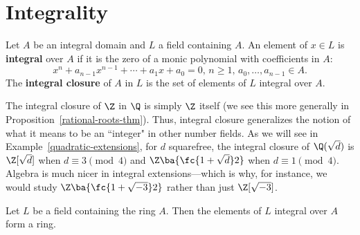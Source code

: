 \section{Integrality}
\begin{df}
Let $A$ be an integral domain and $L$ a field containing $A$. An element of $x\in L$ is \textbf{integral} over $A$ if it is the zero of a monic polynomial with coefficients in $A$:
\[
x^n+a_{n-1}x^{n-1}+\cdots +a_1x+a_0=0,\, n\ge 1,\, a_0,\ldots, a_{n-1}\in A.
\]
The \textbf{integral closure} of $A$ in $L$ is the set of elements of $L$ integral over $A$.
\end{df}
\begin{ex}
The integral closure of $\Z$ in $\Q$ is simply $\Z$ itself (we see this more generally in Proposition~\ref{rational-roots-thm}). Thus, integral closure generalizes the notion of what it means to be an ``integer" in other number fields. As we will see in Example~\ref{quadratic-extensions}, for $d$ squarefree, the integral closure of $\Q(\sqrt{d})$ is $\Z[\sqrt{d}]$ when $d\equiv 3\pmod 4$ and $\Z\ba{\fc{1+\sqrt{d}}2}$ when $d\equiv 1\pmod 4$. Algebra is much nicer in integral extensions---which is why, for instance, we would study $\Z\ba{\fc{1+\sqrt{-3}}2}$ rather than just $\Z[\sqrt{-3}]$.
\end{ex}
\begin{thm}
Let $L$ be a field containing the ring $A$. Then
the elements of $L$ integral over $A$ form a ring.
\end{thm}
